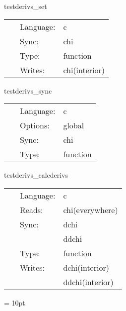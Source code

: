 \vspace{5mm}


\hspace{5mm} testderivs\_set 

\hspace{5mm}{\it set up test data } 


\hspace{5mm}

 \begin{tabular*}{160mm}{cll} 
~ & Language:  & c \\ 
~ & Sync:  & chi \\ 
~ & Type:  & function \\ 
~ & Writes:  & chi(interior) \\ 
\end{tabular*} 


\vspace{5mm}


\hspace{5mm} testderivs\_sync 

\hspace{5mm}{\it synchronize } 


\hspace{5mm}

 \begin{tabular*}{160mm}{cll} 
~ & Language:  & c \\ 
~ & Options:  & global \\ 
~ & Sync:  & chi \\ 
~ & Type:  & function \\ 
\end{tabular*} 


\vspace{5mm}


\hspace{5mm} testderivs\_calcderivs 

\hspace{5mm}{\it calculate derivs } 


\hspace{5mm}

 \begin{tabular*}{160mm}{cll} 
~ & Language:  & c \\ 
~ & Reads:  & chi(everywhere) \\ 
~ & Sync:  & dchi \\ 
~& ~ &ddchi\\ 
~ & Type:  & function \\ 
~ & Writes:  & dchi(interior) \\ 
~& ~ &ddchi(interior)\\ 
\end{tabular*} 



\vspace{5mm}\parskip = 10pt 
